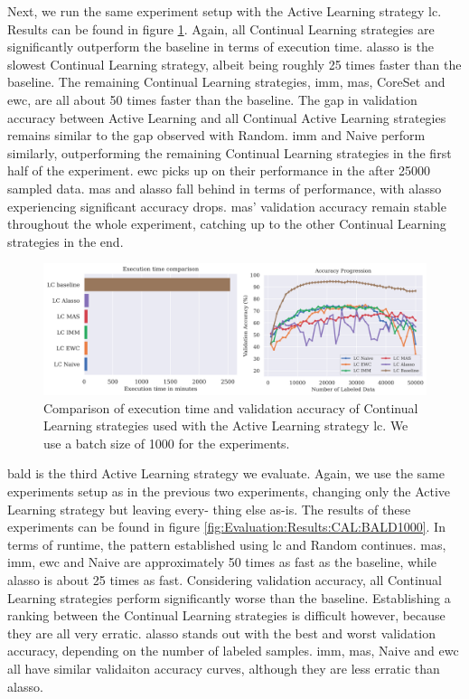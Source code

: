 Next, we run the same experiment setup with the Active Learning strategy \gls{lc}. Results can be found in figure \ref{fig:Evaluation:Results:CAL:LC1000}. Again, all Continual Learning strategies
are significantly outperform the baseline in terms of execution time. \gls{alasso} is the slowest Continual Learning strategy, albeit being roughly 25 times faster than the baseline. The remaining Continual
Learning strategies, \gls{imm}, \gls{mas}, CoreSet and \gls{ewc}, are all about 50 times faster than the baseline. The gap in validation accuracy between Active Learning and all Continual Active Learning strategies
remains similar to the gap observed with Random. \gls{imm} and Naive perform similarly, outperforming the remaining Continual Learning strategies in the first half of the experiment. \gls{ewc} picks up on their
performance in the after 25000 sampled data. \gls{mas} and \gls{alasso} fall behind in terms of performance, with \gls{alasso} experiencing significant accuracy drops. \gls{mas}' validation accuracy remain stable throughout
the whole experiment, catching up to the other Continual Learning strategies in the end. \par

\begin{figure} [h]
    \centering
    \includegraphics[width=\linewidth]{images/results_CAL/LC_CAL_1000b.png}
    \caption[Continual Active Learning \gls{lc} 1000 batch size]{Comparison of execution time and validation accuracy of Continual Learning strategies used with the Active Learning strategy \gls{lc}.
    We use a batch size of 1000 for the experiments.}
    \label{fig:Evaluation:Results:CAL:LC1000}
\end{figure}

\gls{bald} is the third Active Learning strategy we evaluate. Again, we use the same experiments setup as in the previous two experiments, changing only the Active Learning strategy but leaving every-
thing else as-is. The results of these experiments can be found in figure \ref{fig:Evaluation:Results:CAL:BALD1000}. In terms of runtime, the pattern established using \gls{lc} and Random continues.
\gls{mas}, \gls{imm}, \gls{ewc} and Naive are approximately 50 times as fast as the baseline, while \gls{alasso} is about 25 times as fast. Considering validation accuracy, all Continual Learning strategies perform significantly
worse than the baseline. Establishing a ranking between the Continual Learning strategies is difficult however, because they are all very erratic. \gls{alasso} stands out with the best and worst validation
accuracy, depending on the number of labeled samples. \gls{imm}, \gls{mas}, Naive and \gls{ewc} all have similar validaiton accuracy curves, although they are less erratic than \gls{alasso}. \par

